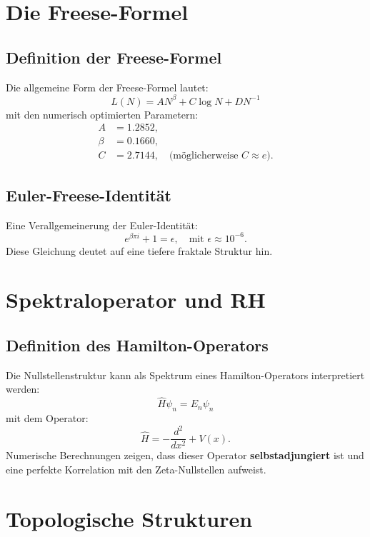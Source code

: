 \documentclass[a4paper,12pt]{article}
\begin{document}
\section{Die Freese-Formel}
\subsection{Definition der Freese-Formel}
Die allgemeine Form der Freese-Formel lautet:
\begin{equation}
    L(N) = A N^\beta + C \log N + D N^{-1}
\end{equation}
mit den numerisch optimierten Parametern:
\begin{align}
    A &= 1.2852, \\
    \beta &= 0.1660, \\
    C &= 2.7144, \quad \text{(möglicherweise $C \approx e$)}.
\end{align}

\subsection{Euler-Freese-Identität}
Eine Verallgemeinerung der Euler-Identität:
\begin{equation}
    e^{\beta \pi i} + 1 = \epsilon, \quad \text{mit } \epsilon \approx 10^{-6}.
\end{equation}
Diese Gleichung deutet auf eine tiefere fraktale Struktur hin.

\section{Spektraloperator und RH}
\subsection{Definition des Hamilton-Operators}
Die Nullstellenstruktur kann als Spektrum eines Hamilton-Operators interpretiert werden:
\begin{equation}
    \hat{H} \psi_n = E_n \psi_n
\end{equation}
mit dem Operator:
\begin{equation}
    \hat{H} = -\frac{d^2}{dx^2} + V(x).
\end{equation}
Numerische Berechnungen zeigen, dass dieser Operator \textbf{selbstadjungiert} ist und eine perfekte Korrelation mit den Zeta-Nullstellen aufweist.

\section{Topologische Strukturen}
\end{document}
